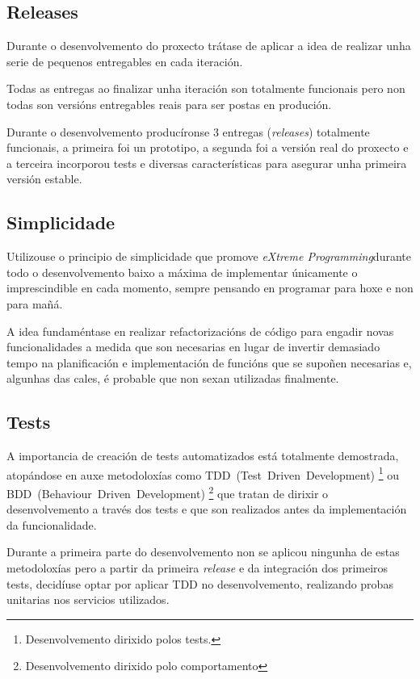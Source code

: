     \subsection{Releases}
    Durante o desenvolvemento do proxecto trátase de aplicar a idea de realizar 
unha serie de pequenos entregables en cada iteración.

    Todas as entregas ao finalizar unha iteración son totalmente funcionais 
pero non todas son versións entregables reais para ser postas en produción.

    Durante o desenvolvemento producíronse 3 entregas (\emph{releases}) 
totalmente funcionais, a primeira foi un prototipo, a segunda foi a versión 
real do proxecto e a terceira incorporou tests e diversas características para 
asegurar unha primeira versión estable.

    \subsection{Simplicidade}
    Utilizouse o principio de simplicidade que promove \emph{eXtreme 
Programming}durante todo o desenvolvemento baixo a máxima de implementar 
únicamente o imprescindible en cada momento, sempre pensando en programar 
para hoxe e non para mañá.

    A idea fundaméntase en realizar refactorizacións de código para engadir 
novas funcionalidades a medida que son necesarias en lugar de invertir 
demasiado tempo na planificación e implementación de funcións que se supoñen 
necesarias e, algunhas das cales, é probable que non sexan utilizadas
finalmente.

    \subsection{Tests}
    A importancia de creación de tests automatizados está totalmente 
demostrada, atopándose en auxe metodoloxías como
TDD~(Test~Driven~Development)%
\footnote{Desenvolvemento dirixido polos tests.} %
ou BDD~(Behaviour~Driven~Development)%
\footnote{Desenvolvemento dirixido polo comportamento} %
que tratan de dirixir o desenvolvemento a través dos tests e
que son realizados antes da implementación da funcionalidade.

    Durante a primeira parte do desenvolvemento non se aplicou ningunha de 
estas metodoloxías pero a partir da primeira \emph{release} e da integración 
dos primeiros tests, decidíuse optar por aplicar TDD no desenvolvemento, 
realizando probas unitarias nos servicios utilizados.

